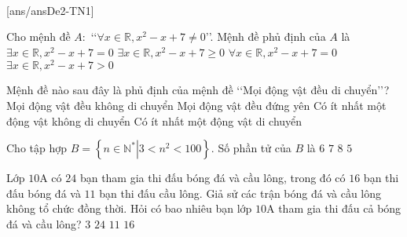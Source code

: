 ﻿﻿\begin{name}
	{\tenchude}
	{\tendethi}
	{\tentruong}
	{\thoigian}
\end{name}
\setcounter{ex}{0}\setcounter{bt}{0}
\TN
{}[ans/ansDe2-TN1]
\begin{ex}%
	Cho mệnh đề $A:$ \lq\lq  $\forall x\in \mathbb{R}, x^2-x+7\ne 0$\rq\rq. Mệnh đề phủ định của $A$ là
	\choice
	{\True $\exists x \in \mathbb{R},x^2-x+7=0$}
	{$\exists x \in \mathbb{R},x^2-x+7\ge0$}
	{$\forall x \in \mathbb{R},x^2-x+7=0$}
	{$\exists  x \in \mathbb{R},x^2-x+7>0$}
\end{ex}

\begin{ex}%
	Mệnh đề nào sau đây là phủ định của mệnh đề \lq\lq  Mọi động vật đều di chuyển\rq\rq?
	\choice
	{Mọi động vật đều không di chuyển}
	{Mọi động vật đều đứng yên}
	{\True Có ít nhất một động vật không di chuyển}
	{Có ít nhất một động vật di chuyển}
\end{ex}

\begin{ex}%
	Cho tập hợp $B=\left\{\left. n\in{\mathbb{N}^*}\right|3<n^2<100\right\}$. Số phần tử của $B$ là
	\choice
	{$6$}
	{$7$}
	{\True $8$}
	{$5$}
\end{ex}

\begin{ex}%
	Lớp $10$A có $24$ bạn tham gia thi đấu bóng đá và cầu lông, trong đó có $16$ bạn thi đấu bóng đá và $11$ bạn thi đấu cầu lông. Giả sử các trận bóng đá và cầu lông không tổ chức đồng thời. Hỏi có bao nhiêu bạn lớp $10$A tham gia thi đấu cả bóng đá và cầu lông?
	\choice
	{\True $3$}
	{$24$}
	{$11$}
	{$16$}
\end{ex}

